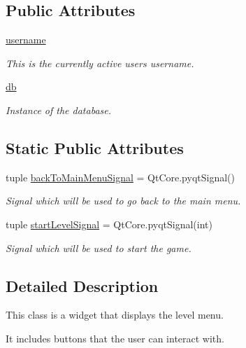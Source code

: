 \subsection*{Public Attributes}
\begin{DoxyCompactItemize}
\item 
\hyperlink{classsrc_1_1level__menu_1_1_level_menu_aee1d2148e23a2908c72c4a8f8ad0a98f}{username}
\begin{DoxyCompactList}\small\item\em This is the currently active user\textquotesingle{}s username. \end{DoxyCompactList}\item 
\hyperlink{classsrc_1_1level__menu_1_1_level_menu_a3224111dd78be1b15cc943f41daef0cf}{db}
\begin{DoxyCompactList}\small\item\em Instance of the database. \end{DoxyCompactList}\end{DoxyCompactItemize}
\subsection*{Static Public Attributes}
\begin{DoxyCompactItemize}
\item 
tuple \hyperlink{classsrc_1_1level__menu_1_1_level_menu_a769225d8895542b2c7118110d7b2ff9d}{back\+To\+Main\+Menu\+Signal} = Qt\+Core.\+pyqt\+Signal()
\begin{DoxyCompactList}\small\item\em Signal which will be used to go back to the main menu. \end{DoxyCompactList}\item 
tuple \hyperlink{classsrc_1_1level__menu_1_1_level_menu_a14a5a5bd905bb0d8e732a33bed71ef44}{start\+Level\+Signal} = Qt\+Core.\+pyqt\+Signal(int)
\begin{DoxyCompactList}\small\item\em Signal which will be used to start the game. \end{DoxyCompactList}\end{DoxyCompactItemize}


\subsection{Detailed Description}
This class is a widget that displays the level menu. 

It includes buttons that the user can interact with. 

